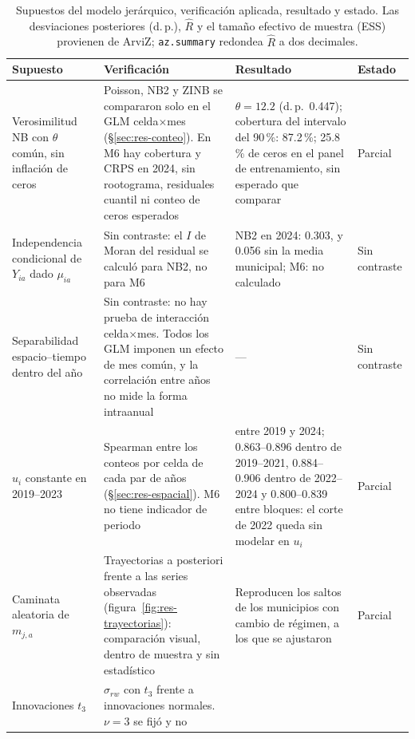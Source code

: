 \begin{table}
	\centering\scriptsize
	\caption{Supuestos del modelo jerárquico, verificación aplicada, resultado y
		estado. Las desviaciones posteriores (d.\,p.), $\hat{R}$ y el tamaño efectivo
		de muestra (ESS) provienen de ArviZ; \texttt{az.summary} redondea $\hat{R}$ a dos decimales.}
	\label{tab:supuestos}
	\begin{tabular}{@{}>{\raggedright\arraybackslash}p{}>{\raggedright\arraybackslash}p{}>{\raggedright\arraybackslash}p{}>{\raggedright\arraybackslash}p{}@{}}
		\toprule
		Supuesto & Verificación & Resultado & Estado \\
		\midrule
		Verosimilitud NB con $\theta$ común, sin inflación de ceros
		& Poisson, NB2 y ZINB se compararon solo en el GLM celda$\times$mes
		(§\ref{sec:res-conteo}). En M6 hay cobertura y CRPS en 2024, sin rootograma,
		residuales cuantil ni conteo de ceros esperados
		& $\theta = 12.2$ (d.\,p.\ 0.447); cobertura del intervalo del 90\,\%: 87.2\,\%;
		25.8\,\% de ceros en el panel de entrenamiento, sin esperado que comparar
		& Parcial \\
		\addlinespace
		Independencia condicional de $Y_{ia}$ dado $\mu_{ia}$
		& Sin contraste: el $I$ de Moran del residual se calculó para NB2, no para M6
		& NB2 en 2024: 0.303, y 0.056 sin la media municipal; M6: no calculado
		& Sin contraste \\
		\addlinespace
		Separabilidad espacio--tiempo dentro del año
		& Sin contraste: no hay prueba de interacción celda$\times$mes. Todos los GLM
		imponen un efecto de mes común, y la correlación entre años no mide la forma
		intraanual
		& ---
		& Sin contraste \\
		\addlinespace
		$u_i$ constante en 2019--2023
		& Spearman entre los conteos por celda de cada par de años
		(§\ref{sec:res-espacial}). M6 no tiene indicador de periodo
		& 0.833 entre 2019 y 2024; 0.863--0.896 dentro de 2019--2021, 0.884--0.906
		dentro de 2022--2024 y 0.800--0.839 entre bloques: el corte de 2022 queda sin
		modelar en $u_i$
		& Parcial \\
		\addlinespace
		Caminata aleatoria de $m_{j,a}$
		& Trayectorias a posteriori frente a las series observadas
		(figura~\ref{fig:res-trayectorias}): comparación visual, dentro de muestra y
		sin estadístico
		& Reproducen los saltos de los municipios con cambio de régimen, a los que se
		ajustaron
		& Parcial \\
		\addlinespace
		Innovaciones $t_3$
		& $\sigma_{rw}$ con $t_3$ frente a innovaciones normales. $\nu = 3$ se fijó y no

\end{tabular}
\end{table}
